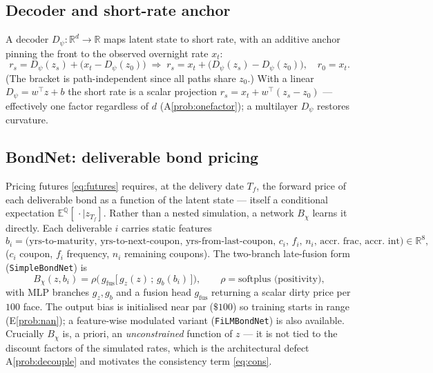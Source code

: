 \documentclass[11pt]{article}
\newcommand{\QQ}{\mathbb{Q}}
\newcommand{\E}{\mathbb{E}}
\newcommand{\R}{\mathbb{R}}
\begin{document}
\subsection{Decoder and short-rate anchor}\label{sec:decoder}
A decoder $D_\psi:\R^d\to\R$ maps latent state to short rate, with an additive
anchor pinning the front to the observed overnight rate $x_t$:
\begin{equation}
r_s=D_\psi(z_s)+\big(x_t-D_\psi(z_0)\big)
\;\Longrightarrow\;
r_s=x_t+\big(D_\psi(z_s)-D_\psi(z_0)\big),\quad r_0=x_t.
\label{eq:anchor}
\end{equation}
(The bracket is path-independent since all paths share $z_0$.) With a linear
$D_\psi=w^\top z+b$ the short rate is a scalar projection
$r_s=x_t+w^\top(z_s-z_0)$ --- effectively one factor regardless of $d$
(A\ref{prob:onefactor}); a multilayer $D_\psi$ restores curvature.

\subsection{BondNet: deliverable bond pricing}\label{sec:bondnet}
Pricing futures \eqref{eq:futures} requires, at the delivery date $T_f$, the
forward price of each deliverable bond as a function of the latent state ---
itself a conditional expectation $\E^{\QQ}[\,\cdot\mid z_{T_f}]$. Rather than a
nested simulation, a network $B_\chi$ learns it directly. Each deliverable $i$
carries static features
\begin{equation}
b_i=\big(\text{yrs-to-maturity},\,\text{yrs-to-next-coupon},\,\text{yrs-from-last-coupon},\,
c_i,\,f_i,\,n_i,\,\text{accr.\ frac},\,\text{accr.\ int}\big)\in\R^{8},
\end{equation}
($c_i$ coupon, $f_i$ frequency, $n_i$ remaining coupons). The two-branch
late-fusion form (\texttt{SimpleBondNet}) is
\begin{equation}
B_\chi(z,b_i)=\rho\Big(\,g_{\text{fus}}\big[\,g_z(z)\,;\,g_b(b_i)\,\big]\Big),
\qquad \rho=\text{softplus (positivity)},
\end{equation}
with MLP branches $g_z,g_b$ and a fusion head $g_{\text{fus}}$ returning a
scalar dirty price per $100$ face. The output bias is initialised near par
($\$100$) so training starts in range (E\ref{prob:nan}); a feature-wise
modulated variant (\texttt{FiLMBondNet}) is also available. Crucially $B_\chi$
is, a priori, an \emph{unconstrained} function of $z$ --- it is not tied to the
discount factors of the simulated rates, which is the architectural defect
A\ref{prob:decouple} and motivates the consistency term \eqref{eq:cons}.
\end{document}
